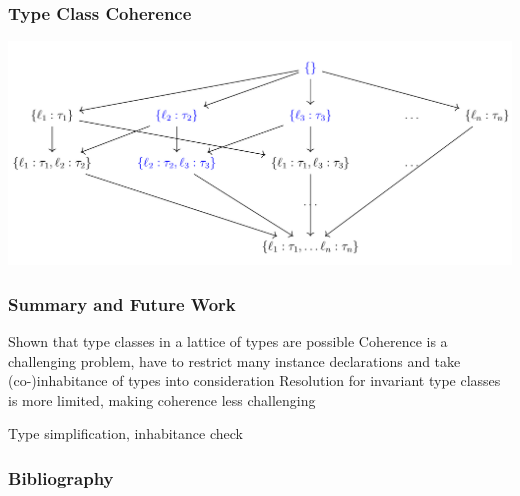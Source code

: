 \documentclass{beamer}
\begin{document}
\begin{frame}
  \frametitle{Type Class Coherence}

  \includegraphics[width=\textwidth]{images/upper_set.png}

  \end{frame}


\begin{frame}
  \frametitle{Summary and Future Work}
  Shown that type classes in a lattice of types are possible
  Coherence is a challenging problem, have to restrict many instance declarations and take (co-)inhabitance of types into consideration
  Resolution for invariant type classes is more limited, making coherence less challenging

  Type simplification, inhabitance check

\end{frame}

\begin{frame}
  \frametitle{Bibliography}
  \footnotesize
  
  
\end{frame}
\end{document}
